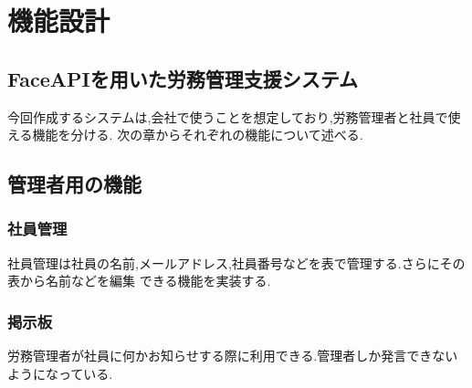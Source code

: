 \chapter{機能設計}
\label{chp:chart}

\section{FaceAPIを用いた労務管理支援システム}
\label{sec:chart_figure}
今回作成するシステムは,会社で使うことを想定しており,労務管理者と社員で使える機能を分ける.
次の章からそれぞれの機能について述べる.

\section{管理者用の機能}
\label{sec:chart_admin}
\subsection{社員管理}
社員管理は社員の名前,メールアドレス,社員番号などを表で管理する.さらにその表から名前などを編集
できる機能を実装する.

\subsection{掲示板}
労務管理者が社員に何かお知らせする際に利用できる.管理者しか発言できないようになっている.

